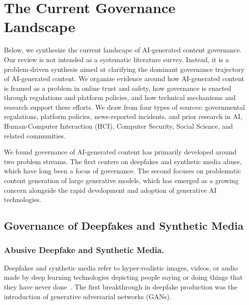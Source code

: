\section{The Current Governance Landscape}
\label{sec:history}
Below, we synthesize the current landscape of AI-generated content governance. Our review is not intended as a systematic literature survey. Instead, it is a problem-driven synthesis aimed at clarifying the dominant governance trajectory of AI-generated content. We organize evidence around how AI-generated content is framed as a problem in online trust and safety, how governance is enacted through regulations and platform policies, and how technical mechanisms and research support these efforts. We draw from four types of sources: governmental regulations, platform policies, news-reported incidents, and prior research in AI, Human-Computer Interaction (HCI), Computer Security, Social Science, and related communities.

We found governance of AI-generated content has primarily developed around two problem streams. The first centers on deepfakes and synthetic media abuse, which have long been a focus of governance. The second focuses on problematic content generation of large generative models, which has emerged as a growing concern alongside the rapid development and adoption of generative AI technologies. 


\subsection{Governance of Deepfakes and Synthetic Media}
\label{subsec:deepfakeabuse}
\subsubsection{Abusive Deepfake and Synthetic Media.}
Deepfakes and synthetic media refer to hyper-realistic images, videos, or audio made by deep learning technologies depicting people saying or doing things that they have never done~\cite{westerlund2019emergence, gamage2022deepfakes}. The first breakthrough in deepfake production was the introduction of generative adversarial networks (GANs).


